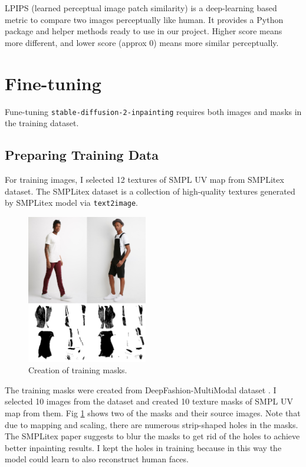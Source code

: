 \documentclass[acmtog]{acmart}
\begin{document}
LPIPS (learned perceptual image patch similarity) \cite{zhang2018unreasonable} is a deep-learning based metric to compare two images perceptually like human. It provides a Python package and helper methods ready to use in our project. Higher score means more different, and lower score (approx 0) means more similar perceptually.

\section{Fine-tuning}

Fune-tuning \texttt{stable-diffusion-2-inpainting} requires both images and masks in the training dataset.

\subsection{Preparing Training Data}

For training images, I selected 12 textures of SMPL UV map from SMPLitex dataset. The SMPLitex dataset is a collection of high-quality textures generated by SMPLitex model via \texttt{text2image}.

\begin{figure}[h]
  \centering
  \includegraphics[width=0.47\textwidth]{figs/training_mask.png}
  \caption{Creation of training masks.}
  \label{fig:train_mask}
\end{figure}

The training masks were created from DeepFashion-MultiModal dataset \cite{jiang2022text2human}. I selected 10 images from the dataset and created 10 texture masks of SMPL UV map from them. Fig \ref{fig:train_mask} shows two of the masks and their source images. Note that due to mapping and scaling, there are numerous strip-shaped holes in the masks. The SMPLitex paper suggests to blur the masks to get rid of the holes to achieve better inpainting results. I kept the holes in training because in this way the model could learn to also reconstruct human faces.
\end{document}
